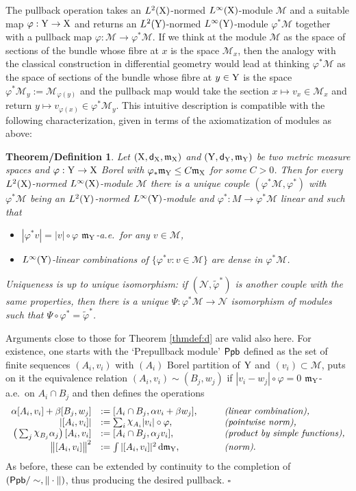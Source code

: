 \documentclass[11pt]{article}
\numberwithin{equation}{section}
\newtheorem{thmdef}[theorem]{Theorem/Definition}
\newenvironment{idea}{\removelastskip\par\medskip   %
\noindent{\em Idea of the proof} \rm}{\penalty-20\null\hfill$\square$\par\medbreak}
\newcommand{\X}{{\rm X}}
\newcommand{\Y}{{\rm Y}}
\newcommand{\sfd}{{\sf d}}
\newcommand{\mm}{{\mathfrak m}}
\renewcommand{\d}{{\rm d}}
\newcommand{\nchi}{{\raise.3ex\hbox{$\chi$}}}
\newcommand{\M}{\mathscr M}
\begin{document}
The pullback operation takes an $L^2(\X)$-normed $L^\infty(\X)$-module  $\M$ and a suitable map $\varphi:\Y\to\X$ and returns an $L^2(\Y)$-normed $L^\infty(\Y)$-module $\varphi^*\M$ together with a pullback map $\varphi:\M\to\varphi^*\M$. If we think at the module $\M$ as the space of sections of the bundle whose fibre at $x$ is the space $\M_x$, then the analogy with the classical construction in differential geometry would lead at thinking $\varphi^*\M$ as the space of sections of the bundle whose fibre at $y\in\Y$ is the space $\varphi^*\M_y:=\M_{\varphi(y)}$ and the pullback map would take the section $x\mapsto v_x\in\M_x$ and return $y\mapsto v_{\varphi(x)}\in \varphi^*\M_y$. This intuitive description is compatible with the following characterization,  given in terms of the axiomatization of modules as  above:
\begin{thmdef}\label{def:pb}  Let $(\X,\sfd_\X,\mm_\X)$ and $(\Y,\sfd_\Y,\mm_\Y)$ be two metric measure spaces and $\varphi:\Y\to\X$ Borel with $\varphi_*\mm_\Y\leq C\mm_\X$ for some $C>0$. Then for every $L^2(\X)$-normed $L^\infty(\X)$-module $\M$ there is a unique couple $(\varphi^*\M,\varphi^*)$ with $\varphi^*\M$ being an $L^2(\Y)$-normed $L^\infty(\Y)$-module and $\varphi^*:M\to\varphi^*\M$ linear and such that
\begin{itemize}
\item[i)] $|\varphi^*v|=|v|\circ\varphi$ $\mm_\Y$-a.e.\ for any $v\in\M$,
\item[ii)] $L^\infty(\Y)$-linear combinations of $\{\varphi^*v:v\in\M\}$ are dense in $\varphi^*\M$.
\end{itemize}
Uniqueness is  up to unique isomorphism: if $(\mathscr N,\tilde\varphi^*)$ is another couple with the same properties, then there is a unique $\Psi:\varphi^*\M\to\mathscr N$ isomorphism of modules such that $\Psi\circ\varphi^*=\tilde\varphi^*$.
\end{thmdef}
\begin{idea} Arguments close to those for Theorem \ref{thmdef:d} are valid also here. For existence, one starts with the `Prepullback module' ${\sf Ppb}$ defined as the set of finite sequences $(A_i,v_i)$ with $(A_i)$ Borel partition of $\Y$ and $(v_i)\subset\M$, puts on it the equivalence relation $(A_i,v_i)\sim(B_j,w_j)$ if $|v_i-w_j|\circ\varphi=0$ $\mm_\Y$-a.e.\ on $A_i\cap B_j$ and then defines the operations
\[
\begin{array}{rll}
\alpha[A_i,v_i]+\beta[B_j,w_j]&:=[A_i\cap B_j,\alpha v_i+\beta w_j],\qquad&\text{\emph {(linear combination),}}\\
|[A_i,v_i]|&:=\sum_i\nchi_{A_i}|v_i|\circ\varphi,\qquad&\text{\emph{(pointwise norm),}}\\
\big(\sum_j\nchi_{B_j}\alpha_j\big)\,[A_i,v_i]&:=[A_i\cap B_j,\alpha_j v_i],\qquad&\text{\emph{(product by simple functions),}}\\
\big\|[A_i,v_i]\big\|^2&:={\int |[A_i,v_i]|^2\,\d\mm_\Y},\qquad&\text{\emph{(norm)}.}
\end{array}
\]
As before, these can be extended by continuity to the completion of $({\sf Ppb}/\sim,\|\cdot\|)$, thus producing the desired pullback.
\end{idea}
\end{document}
